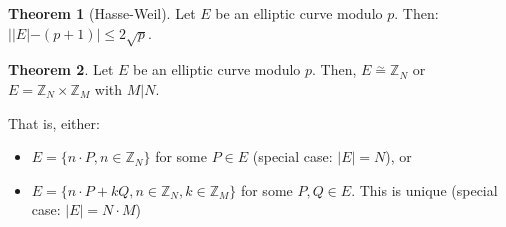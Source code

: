 \documentclass[11pt]{article}
\theoremstyle{definition}
\newtheorem{theorem}{Theorem}[section]
\theoremstyle{proof}
\begin{document}
\begin{theorem}[Hasse-Weil]
	Let $E$ be an elliptic curve modulo $p$. Then: $||E| - (p + 1)| \le 2\sqrt{p}$.
\end{theorem}

\begin{theorem}
	Let $E$ be an elliptic curve modulo $p$. Then, $E \stackrel{\sim}{=} \mathbb{Z}_N$ or $E = \mathbb{Z}_N \times \mathbb{Z}_M$ with $M | N$.
	
	That is, either:
	
	\begin{itemize}
		\item $E = \{n \cdot P, n \in \mathbb{Z}_N\}$ for some $P \in E$ (special case: $|E| = N$), or
		\item $E = \{n \cdot P + kQ, n \in \mathbb{Z}_N, k \in \mathbb{Z}_M\}$ for some $P, Q \in E$. This is unique (special case: $|E| = N \cdot M$)
	\end{itemize}
\end{theorem}
\end{document}
